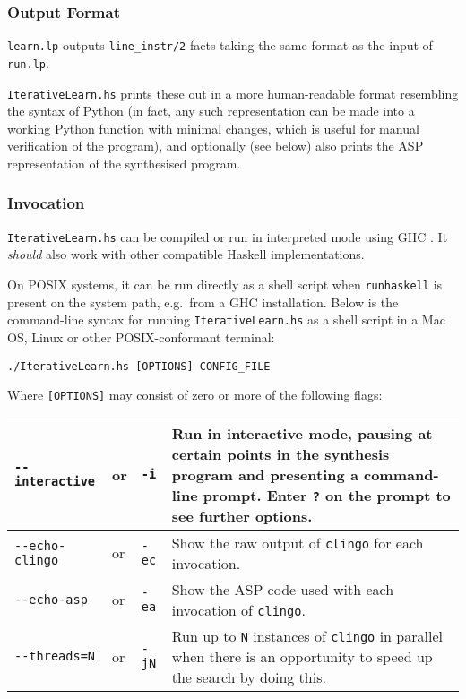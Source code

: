 \documentclass[a4paper,twoside,notitlepage,12pt]{article}
\begin{document}
\subsubsection{Output Format} \label{sec:syx:out}

\verb|learn.lp| outputs \verb|line_instr/2| facts taking the same format as 
the input of \verb|run.lp|.

\verb|IterativeLearn.hs| prints these out in a more human-readable format 
resembling the syntax of Python (in fact, any such representation can be made 
into a working Python function with minimal changes, which is useful for 
manual verification of the program), and optionally (see below) also prints 
the ASP representation of the synthesised program.

\subsubsection{Invocation} \label{sec:syx:inv}

\verb|IterativeLearn.hs| can be compiled or run in interpreted mode using GHC 
\cite{ghc}. It \emph{should} also work with other compatible Haskell 
implementations.

On POSIX systems, it can be run directly as a shell script when 
\verb|runhaskell| is present on the system path, e.g.\ from a GHC 
installation. Below is the command-line syntax for running 
\verb|IterativeLearn.hs| as a shell script in a Mac OS, Linux or other 
POSIX-conformant terminal:

\begin{verbatim}
./IterativeLearn.hs [OPTIONS] CONFIG_FILE
\end{verbatim}

Where \verb|[OPTIONS]| may consist of zero or more of the following flags:

\begin{tabularx}{\textwidth}{|lll|X|}
\hline
\verb|--interactive| &or& \verb|-i|&
Run in interactive mode, pausing at certain points in the synthesis program 
and presenting a command-line prompt. Enter \verb|?| on the prompt to see 
further options. \\
\hline
\verb|--echo-clingo| &or& \verb|-ec| &
Show the raw output of \verb|clingo| for each invocation. \\
\hline
\verb|--echo-asp|    &or& \verb|-ea| &
Show the ASP code used with each invocation of \verb|clingo|. \\
\hline
\verb|--threads=N|   &or& \verb|-jN|&
Run up to \verb|N| instances of \verb|clingo| in parallel when there is an 
opportunity to speed up the search by doing this. \\
\hline
\end{tabularx}
\end{document}
